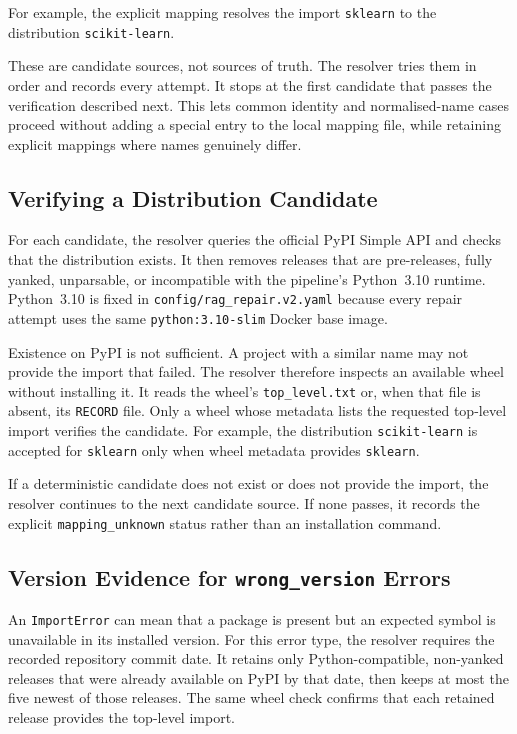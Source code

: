For example, the explicit mapping resolves the import \texttt{sklearn} to the
distribution \texttt{scikit-learn}.

These are candidate sources, not sources of truth. The resolver tries them in
order and records every attempt. It stops at the first candidate that passes
the verification described next. This lets common identity and normalised-name
cases proceed without adding a special entry to the local mapping file, while
retaining explicit mappings where names genuinely differ.

\subsection{Verifying a Distribution Candidate}

For each candidate, the resolver queries the official PyPI Simple API
\cite{pep691} and
checks that the distribution exists. It then removes releases that are
pre-releases, fully yanked, unparsable, or incompatible with the pipeline's
Python~3.10 runtime. Python~3.10 is fixed in
\texttt{config/\allowbreak rag\_repair.v2.yaml} because every repair attempt
uses the same \texttt{python:3.10-slim} Docker base image.

Existence on PyPI is not sufficient. A project with a similar name may not
provide the import that failed. The resolver therefore inspects an available
wheel without installing it. It reads the wheel's \texttt{top\_level.txt} or,
when that file is absent, its \texttt{RECORD} file. Only a wheel whose metadata
lists the requested top-level import verifies the candidate. For example, the
distribution \texttt{scikit-learn} is accepted for \texttt{sklearn} only when
wheel metadata provides \texttt{sklearn}.

If a deterministic candidate does not exist or does not provide the import,
the resolver continues to the next candidate source. If none passes, it records
the explicit \texttt{mapping\_unknown} status rather than an installation
command.

\subsection{Version Evidence for \texttt{wrong\_version} Errors}
\label{sec:m-repair-compat}

An \texttt{ImportError} can mean that a package is present but an expected
symbol is unavailable in its installed version. For this error type, the
resolver requires the recorded repository commit date. It retains only
Python-compatible, non-yanked releases that were already available on PyPI by
that date, then keeps at most the five newest of those releases. The same wheel
check confirms that each retained release provides the top-level import.

